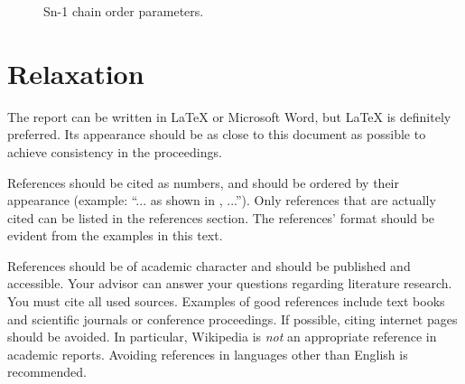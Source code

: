 \documentclass[journal, a4paper]{IEEEtran}
\begin{document}
\begin{figure}[!h]
\caption{Sn-1 chain order parameters.}\label{sn-2_Order_Parameters}
\end{figure}


\section{Relaxation}
	The report can be written in \LaTeX{} or Microsoft Word, but \LaTeX{} is definitely preferred.
	Its appearance should be as close to this document as possible to achieve consistency in the proceedings.

	References should be cited as numbers, and should be ordered by their appearance (example: ``... as shown in \cite{HOP96}, ...'').
	Only references that are actually cited can be listed in the references section.
	The references' format should be evident from the examples in this text.

	References should be of academic character and should be published and accessible.
	Your advisor can answer your questions regarding literature research.
	You must cite all used sources.
	Examples of good references include text books and scientific journals or conference proceedings.
	If possible, citing internet pages should be avoided. In particular, Wikipedia is \emph{not} an appropriate reference in academic reports.
	Avoiding references in languages other than English is recommended.
\end{document}
